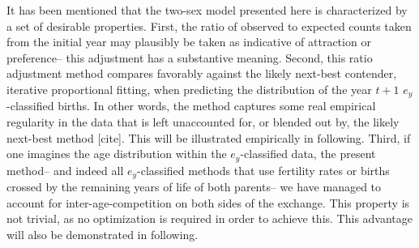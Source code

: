 
It has been mentioned that the two-sex model presented here is characterized by
a set of desirable properties. First, the ratio of observed to expected counts
taken from the initial year may plausibly be taken as indicative of
attraction or preference-- this adjustment has a substantive meaning.
Second, this ratio adjustment method compares favorably against the likely
next-best contender, iterative proportional fitting, when predicting the
distribution of the year $t+1$ $e_y$-classified births. In other words, the
method captures some real empirical regularity in the data that is left
unaccounted for, or blended out by, the likely next-best method [cite]. This
will be illustrated empirically in following. Third, if one imagines the age
distribution within the $e_y$-classified data, the present method-- and indeed
all $e_y$-classified methods that use fertility rates or births crossed by the
remaining years of life of both parents-- we have managed to account for
inter-age-competition on both sides of the exchange. This property is not
trivial, as no optimization is required in order to achieve this. This advantage
will also be demonstrated in following.









